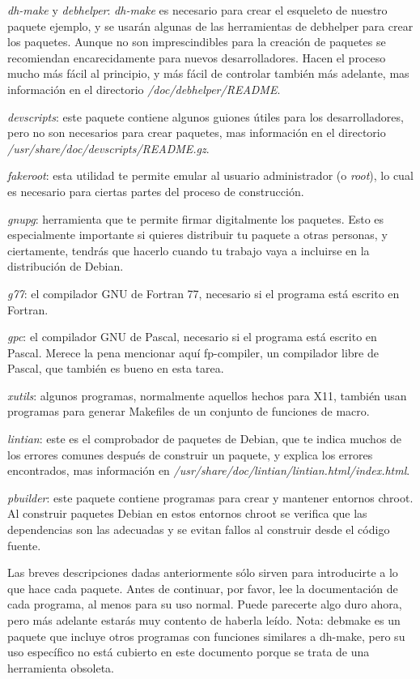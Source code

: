 \documentclass[letterpaper,12pt,spanish]{manual}
\begin{document}
\emph{dh-make} y \emph{debhelper}: \emph{dh-make} es necesario para crear el esqueleto de nuestro paquete ejemplo, y se usarán algunas de las herramientas de debhelper para crear los paquetes. Aunque no son imprescindibles para la creación de paquetes se recomiendan encarecidamente para nuevos desarrolladores. Hacen el proceso mucho más fácil al principio, y más fácil de controlar también más adelante, mas información en el directorio \emph{/doc/debhelper/README}.

\emph{devscripts}: este paquete contiene algunos guiones útiles para los desarrolladores, pero no son necesarios para crear paquetes, mas información en el directorio \emph{/usr/share/doc/devscripts/README.gz}.

\emph{fakeroot}: esta utilidad te permite emular al usuario administrador (o \emph{root}), lo cual es necesario para ciertas partes del proceso de construcción.

\emph{gnupg}: herramienta que te permite firmar digitalmente los paquetes. Esto es especialmente importante si quieres distribuir tu paquete a otras personas, y ciertamente, tendrás que hacerlo cuando tu trabajo vaya a incluirse en la distribución de Debian.

\emph{g77}: el compilador GNU de Fortran 77, necesario si el programa está escrito en Fortran.

\emph{gpc}: el compilador GNU de Pascal, necesario si el programa está escrito en Pascal. Merece la pena mencionar aquí fp-compiler, un compilador libre de Pascal, que también es bueno en esta tarea.

\emph{xutils}: algunos programas, normalmente aquellos hechos para X11, también usan programas para generar Makefiles de un conjunto de funciones de macro.

\emph{lintian}: este es el comprobador de paquetes de Debian, que te indica muchos de los errores comunes después de construir un paquete, y explica los errores encontrados, mas información en \emph{/usr/share/doc/lintian/lintian.html/index.html}.

\emph{pbuilder}: este paquete contiene programas para crear y mantener entornos chroot. Al construir paquetes Debian en estos entornos chroot se verifica que las dependencias son las adecuadas y se evitan fallos al construir desde el código fuente.

Las breves descripciones dadas anteriormente sólo sirven para introducirte a lo que hace cada paquete. Antes de continuar, por favor, lee la documentación de cada programa, al menos para su uso normal. Puede parecerte algo duro ahora, pero más adelante estarás muy contento de haberla leído.
Nota: debmake es un paquete que incluye otros programas con funciones similares a dh-make, pero su uso específico no está cubierto en este documento porque se trata de una herramienta obsoleta.
\end{document}
